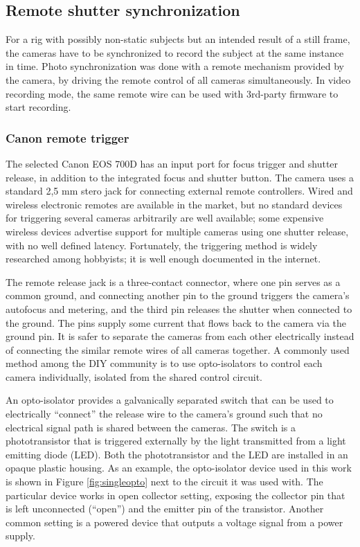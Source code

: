 
\subsection{Remote shutter synchronization} %

For a rig with possibly non-static subjects but an intended result of a still frame, the cameras have to be synchronized to record the subject at the same instance in time.
Photo synchronization was done with a remote mechanism provided by the camera, by driving the remote control of all cameras simultaneously.
In video recording mode, the same remote wire can be used with 3rd-party firmware to start recording.


\subsubsection{Canon remote trigger} %

The selected Canon EOS 700D has an input port for focus trigger and shutter release, in addition to the integrated focus and shutter button.
The camera uses a standard 2,5 mm stero jack for connecting external remote controllers.
Wired and wireless electronic remotes are available in the market, but no standard devices for triggering several cameras arbitrarily are well available; some expensive wireless devices advertise support for multiple cameras using one shutter release, with no well defined latency.
Fortunately, the triggering method is widely researched among hobbyists; it is well enough documented in the internet.

The remote release jack is a three-contact connector, where one pin serves as a common ground, and connecting another pin to the ground triggers the camera's autofocus and metering, and the third pin releases the shutter when connected to the ground. \cite{docdiy}
The pins supply some current that flows back to the camera via the ground pin.
It is safer to separate the cameras from each other electrically instead of connecting the similar remote wires of all cameras together.
A commonly used method among the DIY community is to use opto-isolators to control each camera individually, isolated from the shared control circuit.

An opto-isolator provides a galvanically separated switch that can be used to electrically ``connect'' the release wire to the camera's ground such that no electrical signal path is shared between the cameras.
The switch is a phototransistor that is triggered externally by the light transmitted from a light emitting diode (LED).
Both the phototransistor and the LED are installed in an opaque plastic housing.
As an example, the opto-isolator device used in this work is shown in Figure \ref{fig:singleopto} next to the circuit it was used with.
The particular device works in open collector setting, exposing the collector pin that is left unconnected (``open'') and the emitter pin of the transistor.
Another common setting is a powered device that outputs a voltage signal from a power supply.

